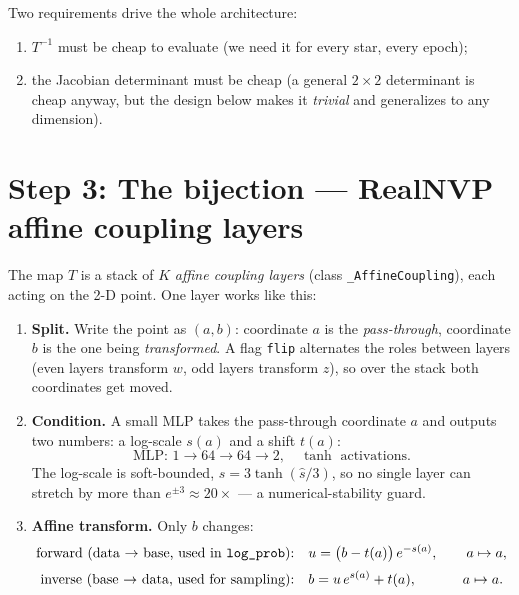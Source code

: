 \documentclass[11pt]{article}
\begin{document}
Two requirements drive the whole architecture:
\begin{enumerate}[label=(\roman*)]
  \item $T^{-1}$ must be cheap to evaluate (we need it for every star, every epoch);
  \item the Jacobian determinant must be cheap (a general $2\times2$ determinant is
        cheap anyway, but the design below makes it \emph{trivial} and generalizes to
        any dimension).
\end{enumerate}

\section{Step 3: The bijection --- RealNVP affine coupling layers}

The map $T$ is a stack of $K$ \emph{affine coupling layers}
(class \texttt{\_AffineCoupling}), each acting on the 2-D point. One layer works
like this:

\begin{enumerate}[label=\textbf{3.\arabic*}]
\item \textbf{Split.} Write the point as $(a, b)$: coordinate $a$ is the
      \emph{pass-through}, coordinate $b$ is the one being \emph{transformed}.
      A flag \texttt{flip} alternates the roles between layers (even layers transform
      $w$, odd layers transform $z$), so over the stack both coordinates get moved.

\item \textbf{Condition.} A small MLP takes the pass-through coordinate $a$ and
      outputs two numbers: a log-scale $s(a)$ and a shift $t(a)$:
      \[
      \text{MLP: } 1 \to 64 \to 64 \to 2, \quad \tanh \text{ activations.}
      \]
      The log-scale is soft-bounded, $s = 3\tanh(\hat s/3)$, so no single layer can
      stretch by more than $e^{\pm 3}\approx 20\times$ --- a numerical-stability guard.

\item \textbf{Affine transform.} Only $b$ changes:
      \begin{align}
      \text{forward (data $\to$ base, used in \texttt{log\_prob}):}\quad
          & u = \bigl(b - t(a)\bigr)\, e^{-s(a)}, \qquad a \mapsto a, \\[2pt]
      \text{inverse (base $\to$ data, used for sampling):}\quad
          & b = u\, e^{s(a)} + t(a), \qquad\quad\; a \mapsto a.
      \end{align}
\end{enumerate}
\end{document}
